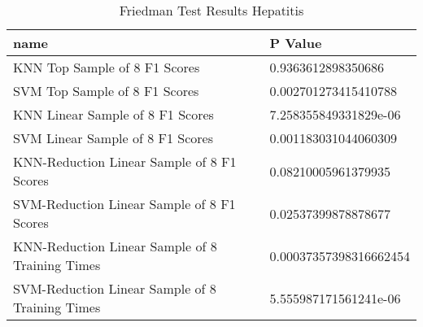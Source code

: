 \begin{table}
\centering
\caption{Friedman Test Results Hepatitis}
\label{tab:friedman_test_results_hepatitis}
\begin{tabular}{ll}
\toprule
name & P Value \\
\midrule
KNN Top Sample of 8 F1 Scores & 0.9363612898350686 \\
SVM Top Sample of 8 F1 Scores & 0.002701273415410788 \\
KNN Linear Sample of 8 F1 Scores & 7.258355849331829e-06 \\
SVM Linear Sample of 8 F1 Scores & 0.001183031044060309 \\
KNN-Reduction Linear Sample of 8 F1 Scores & 0.08210005961379935 \\
SVM-Reduction Linear Sample of 8 F1 Scores & 0.02537399878878677 \\
KNN-Reduction Linear Sample of 8 Training Times & 0.00037357398316662454 \\
SVM-Reduction Linear Sample of 8 Training Times & 5.555987171561241e-06 \\
\bottomrule
\end{tabular}
\end{table}
